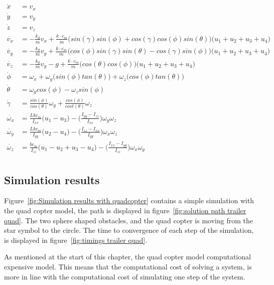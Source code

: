 \begin{equation}
	\begin{aligned}
		\dot{x} &= v_x \\
		\dot{y} &= v_y \\
		\dot{z} &= v_z \\
		\dot{v_x} &= -\frac{k_d}{m}v_x + \frac{k \cdot c_m}{m}\Big(sin(\gamma)sin(\phi)+cos(\gamma)cos(\phi)sin(\theta)\Big)\Big(u_1 + u_2 + u_3 + u_4\Big) \\
		\dot{v_y} &= -\frac{k_d}{m}v_y + \frac{k \cdot c_m}{m}\Big(cos(\phi)sin(\gamma)sin(\theta)-cos(\gamma)sin(\phi)\Big)\Big(u_1 + u_2 + u_3 + u_4\Big) \\
		\dot{v_z} &= -\frac{k_d}{m}v_y -g + \frac{k \cdot c_m}{m}\Big(cos(\theta)cos(\phi)\Big)\Big(u_1 + u_2 + u_3 + u_4\Big) \\
		\dot{\phi} &= \omega_x + \omega_y\Big( sin(\phi)tan(\theta) \Big) + \omega_z \Big( cos(\phi) tan(\theta) \Big) \\
		\dot{\theta} &= \omega_y cos(\phi) - \omega_z sin(\phi) \\
		\dot{\gamma} &= \frac{sin(\phi)}{cos(\theta)}\omega_y + \frac{cos(\phi)}{cost(\theta)} \omega_z \\
		\dot{\omega_x} &= \frac{Lkc_m}{I_{xx}}\Big( u_1 - u_3 \Big) - \Big( \frac{I_{yy}-I_{zz}}{I_{xx}} \Big) \omega_y \omega_z\\
		\dot{\omega_y} &= \frac{Lkc_m}{I_{yy}}\Big( u_2 - u_4 \Big) - \Big( \frac{I_{zz}-I_{xx}}{I_{yy}} \Big) \omega_x \omega_z\\
		\dot{\omega_z} &= \frac{bc_m}{I_{zz}}\Big( u_1 - u_2 + u_3 - u_4 \Big) - \Big( \frac{I_{xx}-I_{yy}}{I_{zz}} \Big) \omega_x \omega_y\\
	\end{aligned}
	\label{eq:mathematical model quadcopter}
\end{equation}

\subsection{Simulation results}
Figure~\ref{fig:Simulation results with quadcopter} contains a simple simulation with the quad copter model, the path is displayed in figure~\ref{fig:solution path trailer quad}. The two sphere shaped obstacles, and the quad copter is moving from the star symbol to the circle. The time to convergence of each step of the simulation, is displayed in figure~\ref{fig:timings trailer quad}.

As mentioned at the start of this chapter, the quad copter model computational expensive model. This means that the computational cost of solving a system, is more in line with the computational cost of simulating one step of the system. 

